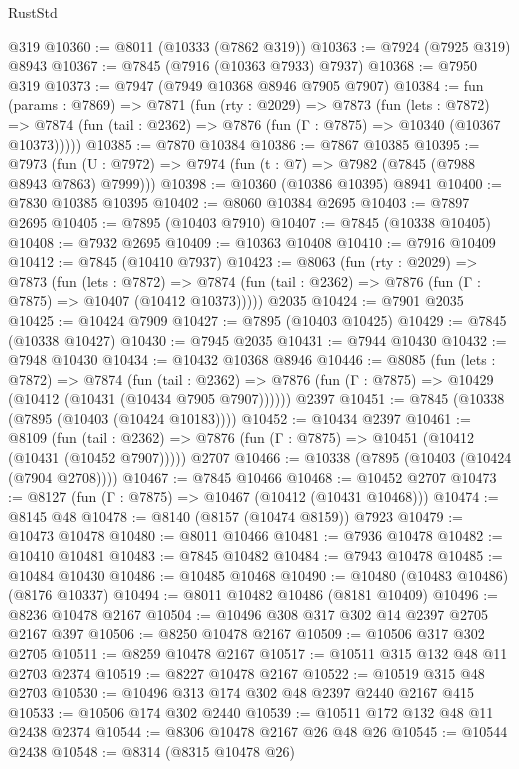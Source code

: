 \begin{lexlean}{RustStd}
\begin{coremodule}
    @319
@10360 := @8011 (@10333 (@7862 @319))
@10363 := @7924 (@7925 @319) @8943
@10367 := @7845 (@7916 (@10363 @7933) @7937)
@10368 := @7950 @319
@10373 := @7947 (@7949 @10368 @8946 @7905 @7907)
@10384 := fun (params : @7869) =>
  @7871
    (fun (rty : @2029) =>
    @7873
      (fun (lets : @7872) =>
      @7874 (fun (tail : @2362) => @7876 (fun (Γ : @7875) => @10340 (@10367 @10373)))))
@10385 := @7870 @10384
@10386 := @7867 @10385
@10395 := @7973 (fun (U : @7972) => @7974 (fun (t : @7) => @7982 (@7845 (@7988 @8943 @7863) @7999)))
@10398 := @10360 (@10386 @10395) @8941
@10400 := @7830 @10385 @10395
@10402 := @8060 @10384 @2695
@10403 := @7897 @2695
@10405 := @7895 (@10403 @7910)
@10407 := @7845 (@10338 @10405)
@10408 := @7932 @2695
@10409 := @10363 @10408
@10410 := @7916 @10409
@10412 := @7845 (@10410 @7937)
@10423 := @8063
    (fun (rty : @2029) =>
    @7873
      (fun (lets : @7872) =>
      @7874 (fun (tail : @2362) => @7876 (fun (Γ : @7875) => @10407 (@10412 @10373)))))
    @2035
@10424 := @7901 @2035
@10425 := @10424 @7909
@10427 := @7895 (@10403 @10425)
@10429 := @7845 (@10338 @10427)
@10430 := @7945 @2035
@10431 := @7944 @10430
@10432 := @7948 @10430
@10434 := @10432 @10368 @8946
@10446 := @8085
    (fun (lets : @7872) =>
    @7874
      (fun (tail : @2362) =>
      @7876 (fun (Γ : @7875) => @10429 (@10412 (@10431 (@10434 @7905 @7907))))))
    @2397
@10451 := @7845 (@10338 (@7895 (@10403 (@10424 @10183))))
@10452 := @10434 @2397
@10461 := @8109
    (fun (tail : @2362) => @7876 (fun (Γ : @7875) => @10451 (@10412 (@10431 (@10452 @7907)))))
    @2707
@10466 := @10338 (@7895 (@10403 (@10424 (@7904 @2708))))
@10467 := @7845 @10466
@10468 := @10452 @2707
@10473 := @8127 (fun (Γ : @7875) => @10467 (@10412 (@10431 @10468)))
@10474 := @8145 @48
@10478 := @8140 (@8157 (@10474 @8159)) @7923
@10479 := @10473 @10478
@10480 := @8011 @10466
@10481 := @7936 @10478
@10482 := @10410 @10481
@10483 := @7845 @10482
@10484 := @7943 @10478
@10485 := @10484 @10430
@10486 := @10485 @10468
@10490 := @10480 (@10483 @10486) (@8176 @10337)
@10494 := @8011 @10482 @10486 (@8181 @10409)
@10496 := @8236 @10478 @2167
@10504 := @10496 @308 @317 @302 @14 @2397 @2705 @2167 @397
@10506 := @8250 @10478 @2167
@10509 := @10506 @317 @302 @2705
@10511 := @8259 @10478 @2167
@10517 := @10511 @315 @132 @48 @11 @2703 @2374
@10519 := @8227 @10478 @2167
@10522 := @10519 @315 @48 @2703
@10530 := @10496 @313 @174 @302 @48 @2397 @2440 @2167 @415
@10533 := @10506 @174 @302 @2440
@10539 := @10511 @172 @132 @48 @11 @2438 @2374
@10544 := @8306 @10478 @2167 @26 @48 @26
@10545 := @10544 @2438
@10548 := @8314 (@8315 @10478 @26)

\end{coremodule}
\end{lexlean}

